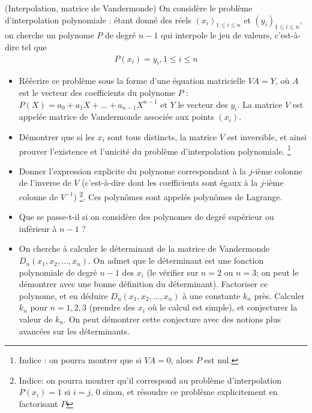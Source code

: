 \documentclass[10pt]{article}
\newcounter{numeroexo}
\newcommand{\exercice}{\par\noindent\stepcounter{numeroexo}
	\hspace{-.25cm}\fbox{\textbf{Exercice \arabic{numeroexo}}}\quad}
\begin{document}
\exercice (Interpolation, matrice de Vandermonde) On considère le problème d'interpolation
polynomiale : étant donné des réels $(x_i)_{1 \leq i \leq n}$ et
$(y_i)_{1 \leq i \leq n}$, on cherche un polynome $P$ de degré $n-1$
qui interpole le jeu de valeurs, c'est-à-dire tel que
\begin{align*}
  P(x_i) = y_i, 1 \leq i \leq n
\end{align*}
\begin{itemize}
\item Réécrire ce problème sous la forme d'une équation matricielle $V
  A = Y$, o\`u $A$ est le vecteur des coefficients du polynome $P$ :
  $P(X) = a_0 + a_1 X + \dots + a_{n-1} X^{n-1}$ et $Y$ le vecteur des
  $y_i$.  La matrice $V$ est appelée matrice de Vandermonde associée
  aux points $(x_i)$.
\item Démontrer que si les $x_i$ sont tous distincts, la matrice $V$
  est inversible, et ainsi prouver l'existence et l'unicité du
  problème d'interpolation polynomiale. \footnote{Indice : on pourra
    montrer que si $V A = 0$, alors $P$ est nul.}
\item Donner l'expression explicite du polynome correspondant à la
  $j$-ième colonne de l'inverse de $V$ (c'est-à-dire dont les
  coefficients sont égaux à la $j$-ième colonne de $V^{-1}$)
  \footnote{Indice: on pourra montrer qu'il correspond au problème
    d'interpolation $P(x_i) = 1$ si $i = j$, 0 sinon, et résoudre ce
    problème explicitement en factorisant $P$}. Ces polynômes sont
  appelés polynômes de Lagrange.
\item Que se passe-t-il si on considère des polynomes
  de degré supérieur ou inférieur à $n-1$ ?
\item On cherche à calculer le déterminant de la matrice de
  Vandermonde $D_n(x_1, x_2, \dots, x_n)$. On admet que le déterminant
  est une fonction polynomiale de degré $n-1$ des $x_i$ (le vérifier
  sur $n = 2$ ou $n = 3$; on peut le démontrer avec une bonne
  définition du déterminant). Factoriser ce polynome, et en déduire
  $D_n(x_1, x_2, \dots, x_n)$ à une constante $k_n$ près. Calculer
  $k_n$ pour $n = 1, 2, 3$ (prendre des $x_i$ où le calcul est
  simple), et conjecturer la valeur de $k_n$. On peut démontrer cette
  conjecture avec des notions plus avancées sur les déterminants.
\end{itemize}
\end{document}

